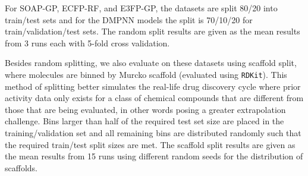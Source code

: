 For SOAP-GP, ECFP-RF, and E3FP-GP, the datasets are split 80/20 into train/test sets and for the DMPNN models the split is 70/10/20 for train/validation/test sets. The random split results are given as the mean results from 3 runs each with 5-fold cross validation.

Besides random splitting, we also evaluate on these datasets using scaffold split, where molecules are binned by Murcko scaffold (evaluated using \texttt{RDKit}). This method of splitting better simulates the real-life drug discovery cycle where prior activity data only exists for a class of chemical compounds that are different from those that are being evaluated, in other words posing a greater extrapolation challenge. Bins larger than half of the required test set size are placed in the training/validation set and all remaining bins are distributed randomly such that the required train/test split sizes are met. The scaffold split results are given as the mean results from 15 runs using different random seeds for the distribution of scaffolds.

